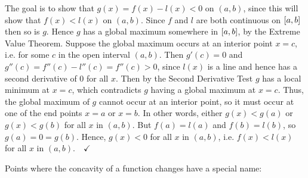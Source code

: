 The goal is to show that $g(x) = f(x) - l(x) < 0$ on $(a,b)$, since
this will show that $f(x) < l(x)$ on $(a,b)$. Since $f$ and $l$ are both
continuous on $\lbrack a,b \rbrack$ then so is $g$. Hence $g$ has a global maximum
somewhere in $\lbrack a,b \rbrack$, by the Extreme Value Theorem. Suppose the global
maximum occurs at an interior point $x=c$, i.e. for some $c$ in the open
interval $(a,b)$. Then $g'(c)=0$ and $g''(c)=f''(c)-l''(c)=f''(c)>0$, since
$l(x)$ is a line and hence has a second derivative of $0$ for all $x$. Then
by the Second Derivative Test $g$ has a local minimum at $x=c$, which
contradicts $g$ having a global maximum at $x=c$. Thus, the global maximum of
$g$ cannot occur at an interior point, so it must occur at one of the end points
$x=a$ or $x=b$. In other words, either $g(x)<g(a)$ or $g(x)<g(b)$ for all $x$ in
$(a,b)$. But $f(a)=l(a)$ and $f(b)=l(b)$, so $g(a)=0=g(b)$. Hence, $g(x)<0$ for
all $x$ in $(a,b)$, i.e. $f(x) < l(x)$ for all $x$ in $(a,b).
\quad\checkmark$\vspace{2mm}\\
\divider
\vspace{3mm}

Points where the concavity of a function changes have a special name:



